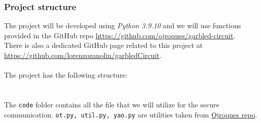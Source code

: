 \documentclass[12pt]{article}
\newcommand{\inlinecode}{\texttt}
\begin{document}
\subsubsection{Project structure}
The project will be developed using \textit{Python 3.9.10} and we will use functions provided in the GitHub repo \url{https://github.com/ojroques/garbled-circuit}\label{ref:git}.\\
There is also a dedicated GitHub page related to this project at \url{https://github.com/lorenzozanolin/garbledCircuit}\label{zanoGit}.\\ \\ The project has the following structure:\\
\\ \\
The \inlinecode{code} folder contains all the file that we will utilize for the secure communication. \inlinecode{ot.py, util.py, yao.py} are utilities taken from \hyperref[ref:git]{Ojroques repo}.
\end{document}
